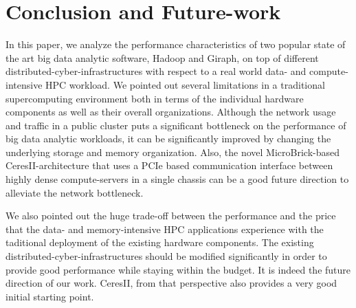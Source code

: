 \documentclass[conference]{IEEEtran}
\begin{document}
\section {Conclusion and Future-work} \label{conclusion}
In this paper, we analyze the performance characteristics of two popular state of the art big data analytic software, Hadoop and Giraph, on top of different distributed-cyber-infrastructures with respect to a real world data- and compute-intensive HPC workload.
We pointed out several limitations in a traditional supercomputing environment both in terms of the individual hardware components as well as their overall organizations.
Although the network usage and traffic in a public cluster puts a significant bottleneck on the performance of big data analytic workloads, it can be significantly improved by changing the underlying storage and memory organization.
Also, the novel MicroBrick-based CeresII-architecture that uses a PCIe based communication interface between highly dense compute-servers in a single chassis can be a good future direction to alleviate the network bottleneck.

We also pointed out the huge trade-off between the performance and the price that the data- and memory-intensive HPC applications experience with the taditional deployment of the existing hardware components. 
The existing distributed-cyber-infrastructures should be modified significantly in order to provide good performance while staying within the budget. 
It is indeed the future direction of our work.
CeresII, from that perspective also provides a very good initial starting point.








\end{document}
